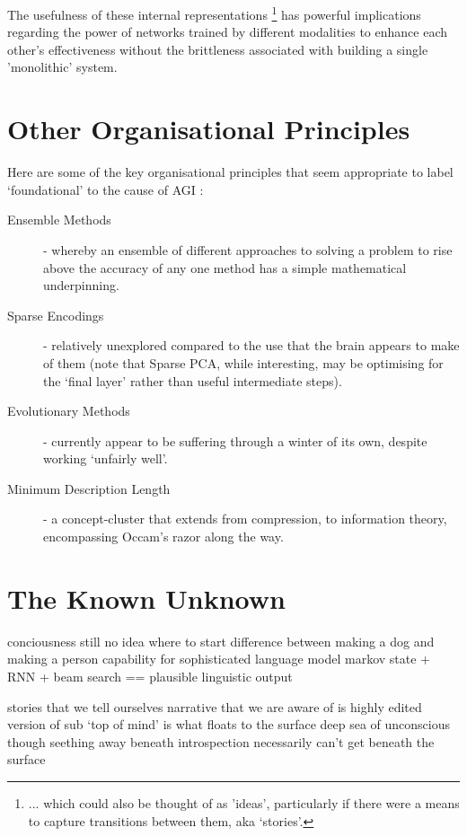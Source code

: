 \documentclass[citeauthoryear]{llncs}
\begin{document}
The usefulness of these internal representations
\footnote{ ... which could also be thought of as 'ideas', particularly 
if there were a means to capture transitions between them, aka `stories'.}
has powerful implications regarding the power of networks trained by 
different modalities to enhance each other's effectiveness without the 
brittleness associated with building a single 'monolithic' system.




\section{Other Organisational Principles}

Here are some of the key organisational principles that seem appropriate 
to label `foundational' to the cause of AGI :
\begin{description}
\item[Ensemble Methods] - whereby an ensemble of different approaches to 
solving a problem to rise above the accuracy 
of any one method has a simple mathematical underpinning.  
\item[Sparse Encodings] - relatively unexplored compared to the use that 
the brain appears to make of them (note that Sparse PCA, while interesting, 
may be optimising for the `final layer' rather than useful intermediate steps).
\item[Evolutionary Methods] - currently appear to be suffering through 
a winter of its own, despite working `unfairly well'.
\item[Minimum Description Length] - a concept-cluster that extends from compression, 
to information theory, encompassing Occam's razor along the way.
\end{description}


\section{The Known Unknown}

conciousness 
  still no idea where to start
  difference between making a dog and making a person
    capability for sophisticated language model
      markov state + RNN + beam search == plausible linguistic output
  
  stories that we tell ourselves
    narrative that we are aware of is highly edited version of sub
      `top of mind' is what floats to the surface
      deep sea of unconscious though seething away beneath
  introspection necessarily can't get beneath the surface
\end{document}
